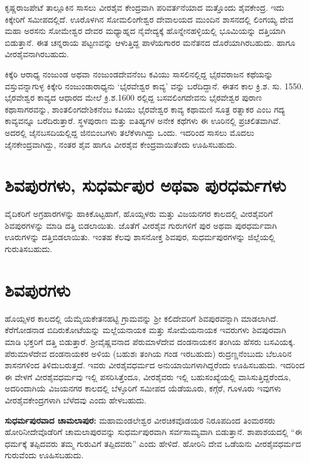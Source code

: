 ಕೃಷ್ಣರಾಜಪೇಟೆ ತಾಲ್ಲೂಕಿನ ಸಾಸಲು ವೀರಶೈವ ಕೇಂದ್ರವಾಗಿ ಪರಿವರ್ತನೆಯಾದ ಮತ್ತೊಂದು ಶೈವಕೇಂದ್ರ. ಇದು ಕಿಕ್ಕೇರಿಗೆ ಸಮೀಪದಲ್ಲಿದೆ. ಊರೊಳಗಿನ ಸೋಮಲಿಂಗೇಶ್ವರ ದೇವಾಲಯದ ಮುಂದಿನ ಶಾಸನದಲ್ಲಿ ಲಿಂಗಯ್ಯ ದೇವ ಮಹಾ ಅರಸನು ಸೋಮೇಶ್ವರ ದೇವರ ಮಧ್ಯಾಹ್ನದ ನೈವೇದ್ಯಕ್ಕೆ ಹೊನ್ನೇನಹಳ್ಳಿಯಲ್ಲಿ ಭೂಮಿಯನ್ನು ದತ್ತಿಯಾಗಿ ಬಿಡುತ್ತಾನೆ. ಈತ ಚನ್ನರಾಯ ಪಟ್ಟಣವನ್ನು ಆಳುತ್ತಿದ್ದ ಪಾಳೆಯಗಾರರ ಮನೆತನದ ದೊರೆಯಾಗಿರಬಹುದು. ಹಾಗೂ ವೀರಶೈವನಾಗಿರಬಹುದು.

ಕಿಕ್ಕೆರಿ ಆರಾಧ್ಯ ನಂಜುಂಡ ಅಥವಾ ನಂಜುಂಡದೇವನೆಂಬ ಕವಿಯು ಸಾಸಲಿನಲ್ಲಿದ್ದ ಭೈರವರಾಜನ ಕಥೆಯನ್ನು ವಸ್ತುವನ್ನಾಗುಳ್ಳ ಕಿಕ್ಕೇರಿ ನಂಜುಂಡಾರಾಧ್ಯನು ‘ಭೈರವೇಶ್ವರ ಕಾವ್ಯ’ ವನ್ನು ಬರೆದಿದ್ದಾನೆ. ಈತನ ಕಾಲ ಕ್ರಿ.ಶ. ಸು. 1550. ಭೈರವೇಶ್ವರ ಕಾವ್ಯದ ಆಧಾರದ ಮೇಲೆ ಕ್ರಿ.ಶ.1600 ರಲ್ಲಿದ್ದ ಬಸವಲಿಂಗದೇವನು ಭೈರವೇಶ್ವರ ಪುರಾಣ ಕಥಾಸಾಗರವನ್ನು, ಶಾಂತಲಿಂಗದೇಶಿಕನೆಂಬ ಕವಿಯು ಭೈರವೇಶ್ವರ ಕಾವ್ಯ ಕಥಾಮಣಿ ಸೂತ್ರ ರತ್ನಾಕರ ಎಂಬ ಗದ್ಯ ಕಾವ್ಯವನ್ನೂ ಬರೆದಿರುತ್ತಾರೆ. ಸ್ಥಳಪುರಾಣ ಮತ್ತು ಐತಿಹ್ಯಗಳ ಅನೇಕ ಕಥೆಗಳು ಈ ಊರಿನಲ್ಲಿ ಪ್ರಚಲಿತವಾಗಿವೆ. ಅದರಲ್ಲಿ ಜೈನಬಸದಿಯಲ್ಲಿದ್ದ ಜಿನಬಿಂಬಗಳು ತಲೆಕೆಳಾಗಿದ್ದು ಒಂದು. ಇದರಿಂದ ಸಾಸಲು ಮೊದಲು ಜೈನಕೇಂದ್ರವಾಗಿದ್ದು, ನಂತರ ಶೈವ ಹಾಗೂ ವೀರಶೈವ ಕೇಂದ್ರವಾಯಿತೆಂದು ಊಹಿಸಬಹುದು.


\section{ಶಿವಪುರಗಳು, ಸುಧರ್ಮಪುರ ಅಥವಾ ಪುರಧರ್ಮಗಳು}

ವೈದಿಕರಿಗೆ ಅಗ್ರಹಾರಗಳನ್ನು ಹಾಕಿಕೊಟ್ಟಹಾಗೆ, ಹೊಯ್ಸಳರು ಮತ್ತು ವಿಜಯನಗರ ಕಾಲದಲ್ಲಿ ವೀರಶೈವರಿಗೆ ಶಿವಪುರಗಳನ್ನು ಮಾಡಿ ದತ್ತಿ ಬಿಡಲಾಯಿತು. ಜೊತೆಗೆ ವೀರಶೈವ ಗುರುಗಳಿಗೆ ಪುರ ಅಥವಾ ಪುರಧರ್ಮವಾಗಿ ಊರುಗಳನ್ನು ದತ್ತಿಬಿಡಲಾಯಿತು. ಇಂತಹ ಕೆಲವು ಶಾಸನೋಕ್ತ ಶಿವಪುರ, ಸುಧರ್ಮಪುರಗಳನ್ನು ಜಿಲ್ಲೆಯಲ್ಲಿ ಗುರುತಿಸಬಹುದು.


\section{ಶಿವಪುರಗಳು}

ಹೊಯ್ಸಳರ ಕಾಲದಲ್ಲಿ ಯೆಮ್ಮೆಯಕೇತನಹಟ್ಟಿ ಗ್ರಾಮವನ್ನು ಶ‍್ರೀ ಕಲಿದೇವರಿಗೆ ಶಿವಪುರವನ್ನಾಗಿ ಮಾಡಲಾಗಿದೆ. ಕೆರೆಗೋಡನಾಡ ಬಿದಿರುಕೋಟೆಯನ್ನು ಮಲ್ಲೆಯನಾಯಕ ಮತ್ತು ಸೋಮೆಯನಾಯಕ ಇವರುಗಳು ಶಿವಪುರವಾಗಿ ಮಾಡಿ ಭಕ್ತರಿಗೆ ದತ್ತಿ ಬಿಡುತ್ತಾರೆ. ಶ‍್ರೀವೈಷ್ಣವನಾದ ಪೆರುಮಾಳೆದೇವ ದಂಡನಾಯಕನ ತಂಗಿಯ ಹೆಸರು ಬಸವಿಯಕ್ಕ. ಪೆರುಮಾಳೆದೇವ ದಂಡನಾಯಕರ ಅಳಿಯ (ಬಹುಶಃ ತಂಗಿಯ ಗಂಡ ಇರಬಹುದು) ರುದ್ರಣ್ಣನೆಂಬುದು ಬೆಲೂರಿನ ಶಾಸನಗಳಿಂದ ತಿಳಿದುಬರುತ್ತದೆ. ಇವರು ವೀರಶೈವಧರ್ಮದ ಅನುಯಾಯಿಗಳಾಗಿದ್ದರೆಂದು ಊಹಿಸಬಹುದು. ಇದರಿಂದ ಈ ವೇಳಗೆ ವೀರಶೈವಧರ್ಮವು ಇಲ್ಲಿ ಪಸರಿಸಿತ್ತೆಂದೂ, ವೀರಶೈವರು ಇಲ್ಲಿ ಬಹುಸಂಖ್ಯೆಯಲ್ಲಿ ವಾಸಿಸುತ್ತಿದ್ದರೆಂದೂ, ಅದರಿಂದಾಗಿಯೆ ವಿಜಯನಗರ ಕಾಲದಲ್ಲಿ ಬೆಳ್ಳೂರಿಗೆ ಸಮೀಪದ ಯೆಡೆಯೂರು, ಕಗ್ಗೆರೆ, ಗೂಳೂರು ಇವುಗಳು ವೀರಶೈವಕೇಂದ್ರಗಳಾಗಿ ಬೆಳೆದವು ಎಂದು ಹೇಳಬಹುದು.

\textbf{ಸುಧರ್ಮಪುರವಾದ ಚಾಮಲಾಪುರ:} ಮಹಾಮಂಡಲೇಶ್ವರ ವೀರಚಿಕವೊಡಯರ ನಿರೂಪದಿಂದ ತಿಂಮರಸರು ಹೋರಿನೀದೇವೊಡೆರಿಗೆ ಚಾಮಲಾಪುರವನ್ನು ಸುಧರ್ಮಪುರವಾಗಿ ಸರ್ವಸಾಮ್ಯವಾಗಿ ಬಿಡುತ್ತಾನೆ. ಶಾಪಾಶಯದಲ್ಲಿ “ಈ ಧರ್ಮಕ್ಕೆ ತಪ್ಪಿದವರು ತಮ್ಮ ಗುರುವಿಗೆ ತಪ್ಪಿದವರು” ಎಂದು ಹೇಳಿದೆ. ಹೋರಿನಿ ದೇವ ಒಡೆಯನು ವೀರಶೈವಧರ್ಮದ ಗುರುವೆಂದು ಊಹಿಸಬಹುದು.

